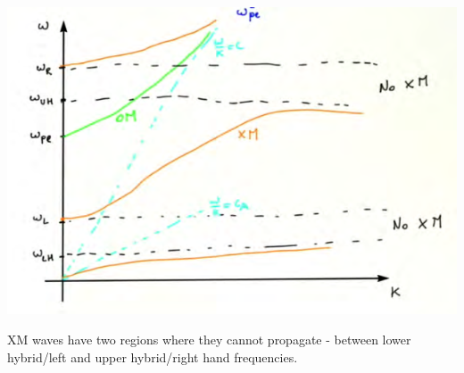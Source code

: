 \documentclass[PlasmaNotes.tex]{subfiles}
\begin{document}
\includegraphics[width=\linewidth]{OMXMfrequencies}

XM waves have two regions where they cannot propagate - between lower hybrid/left and upper hybrid/right hand frequencies.
\end{document}
